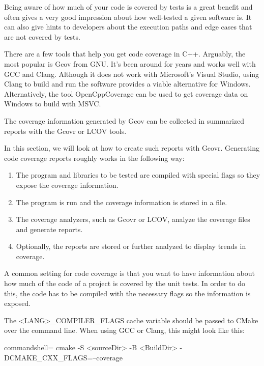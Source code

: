 
Being aware of how much of your code is covered by tests is a great benefit and often gives a very good impression about how well-tested a given software is. It can also give hints to developers about the execution paths and edge cases that are not covered by tests.

There are a few tools that help you get code coverage in C++. Arguably, the most popular is Gcov from GNU. It's been around for years and works well with GCC and Clang. Although it does not work with Microsoft's Visual Studio, using Clang to build and run the software provides a viable alternative for Windows. Alternatively, the tool OpenCppCoverage can be used to get coverage data on Windows to build with MSVC.

The coverage information generated by Gcov can be collected in summarized reports with the Gcovr or LCOV tools.


In this section, we will look at how to create such reports with Gcovr. Generating code coverage reports roughly works in the following way:

\begin{enumerate}
\item 
The program and libraries to be tested are compiled with special flags so they expose the coverage information.

\item 
The program is run and the coverage information is stored in a file.

\item 
The coverage analyzers, such as Gcovr or LCOV, analyze the coverage files and generate reports.

\item 
Optionally, the reports are stored or further analyzed to display trends in coverage.
\end{enumerate}

A common setting for code coverage is that you want to have information about how much of the code of a project is covered by the unit tests. In order to do this, the code has to be compiled with the necessary flags so the information is exposed.

The <LANG>\_COMPILER\_FLAGS cache variable should be passed to CMake over the command line. When using GCC or Clang, this might look like this:

\begin{tcblisting}{commandshell={}}
cmake -S <sourceDir> -B <BuildDir> -DCMAKE_CXX_FLAGS=--coverage
\end{tcblisting}

